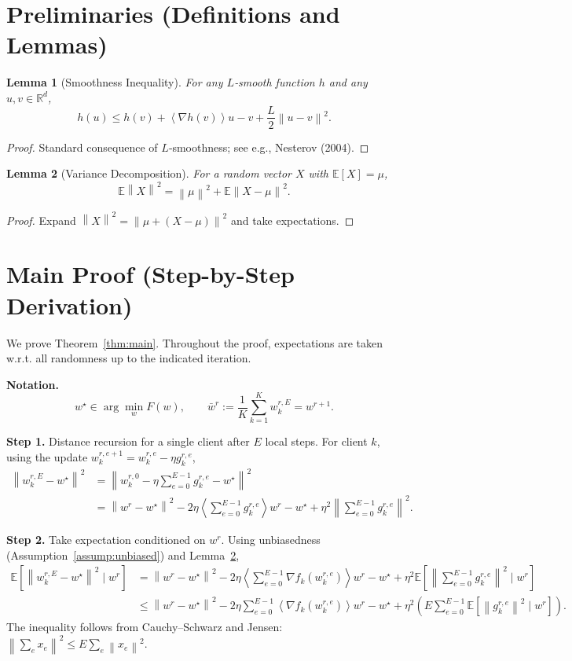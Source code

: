 \documentclass[11pt]{article}
\newtheorem{lemma}{Lemma}
\newcommand{\E}{\mathbb{E}}
\newcommand{\R}{\mathbb{R}}
\newcommand{\norm}[1]{\left\|#1\right\|}
\newcommand{\inner}[1]{\left\langle#1\right\rangle}
\begin{document}
\newpage
\section*{Preliminaries (Definitions and Lemmas)}
\begin{lemma}[Smoothness Inequality]\label{lem:smooth}
For any $L$‑smooth function $h$ and any $u,v\in\R^{d}$,
\[
h(u)\le h(v)+\inner{\nabla h(v)}{u-v}+\frac{L}{2}\norm{u-v}^{2}.
\]
\end{lemma}
\begin{proof}
Standard consequence of $L$‑smoothness; see e.g., Nesterov (2004). \qedhere
\end{proof}
\begin{lemma}[Variance Decomposition]\label{lem:var}
For a random vector $X$ with $\E[X]=\mu$,
\[
\E\norm{X}^{2}= \norm{\mu}^{2}+ \E\norm{X-\mu}^{2}.
\]
\end{lemma}
\begin{proof}
Expand $\norm{X}^{2}=\norm{\mu+(X-\mu)}^{2}$ and take expectations. \qedhere
\end{proof}

\section*{Main Proof (Step-by-Step Derivation)}
We prove Theorem~\ref{thm:main}. Throughout the proof, expectations are taken w.r.t. all randomness up to the indicated iteration.

\noindent\textbf{Notation.}
\[
w^{\star}\in\arg\min_{w}F(w),\qquad 
\bar w^{r}:=\frac{1}{K}\sum_{k=1}^{K} w_{k}^{r,E}=w^{r+1}.
\]

\noindent\textbf{Step 1.}  Distance recursion for a single client after $E$ local steps.  
For client $k$, using the update $w_{k}^{r,e+1}=w_{k}^{r,e}-\eta g_{k}^{r,e}$,
\begin{align}
\norm{w_{k}^{r,E}-w^{\star}}^{2}
&= \norm{w_{k}^{r,0}-\eta\sum_{e=0}^{E-1} g_{k}^{r,e}-w^{\star}}^{2}\nonumber\\
&= \norm{w^{r}-w^{\star}}^{2}
   -2\eta\inner{\sum_{e=0}^{E-1} g_{k}^{r,e}}{w^{r}-w^{\star}}
   +\eta^{2}\norm{\sum_{e=0}^{E-1} g_{k}^{r,e}}^{2}.
\tag{Step 1}
\end{align}

\noindent\textbf{Step 2.}  Take expectation conditioned on $w^{r}$. Using unbiasedness (Assumption~\ref{assump:unbiased}) and Lemma~\ref{lem:var},
\begin{align}
\E\!\left[\norm{w_{k}^{r,E}-w^{\star}}^{2}\mid w^{r}\right]
&= \norm{w^{r}-w^{\star}}^{2}
   -2\eta\inner{\sum_{e=0}^{E-1}\nabla f_k(w_{k}^{r,e})}{w^{r}-w^{\star}}
   +\eta^{2}\E\!\left[\norm{\sum_{e=0}^{E-1} g_{k}^{r,e}}^{2}\mid w^{r}\right]\nonumber\\
&\le \norm{w^{r}-w^{\star}}^{2}
   -2\eta\sum_{e=0}^{E-1}\inner{\nabla f_k(w_{k}^{r,e})}{w^{r}-w^{\star}}
   +\eta^{2}\!\left(E\sum_{e=0}^{E-1}\E\!\left[\norm{g_{k}^{r,e}}^{2}\mid w^{r}\right]\right).
\tag{Step 2}
\end{align}
The inequality follows from Cauchy–Schwarz and Jensen:
$\norm{\sum_{e}x_e}^{2}\le E\sum_{e}\norm{x_e}^{2}$.
\end{document}
